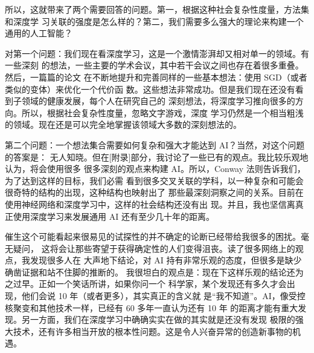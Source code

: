所以，这就带来了两个需要回答的问题。第一，根据这种社会复杂性度量，方法集和深度学
习关联的强度是怎么样的？第二，我们需要多么强大的理论来构建一个通用的人工智能？

对第一个问题：我们现在看深度学习，这是一个激情澎湃却又相对单一的领域。有一些深刻
的想法，一些主要的学术会议，其中若干会议之间也存在着很多重叠。然后，一篇篇的论文
在不断地提升和完善同样的一些基本想法：使用 SGD（或者类似的变体）来优化一个代价函
数。这些想法非常成功。但是我们现在还没有看到子领域的健康发展，每个人在研究自己的
深刻想法，将深度学习推向很多的方向。所以，根据社会复杂性度量，忽略文字游戏，深度
学习仍然是一个相当粗浅的领域。现在还是可以完全地掌握该领域大多数的深刻想法的。

第二个问题：一个想法集合需要如何复杂和强大才能达到 AI？当然，对这个问题的答案是：
无人知晓。但在[附录]部分，我讨论了一些已有的观点。我比较乐观地认为，将会使用很多
很多深刻的观点来构建 AI。所以，Conway 法则告诉我们，为了达到这样的目标，我们必需
看到很多交叉关联的学科，以一种复杂和可能会很奇特的结构的出现，这种结构也映射出了
那些最深刻洞察之间的关系。目前在使用神经网络和深度学习中，这样的社会结构还没有出
现。并且，我也坚信离真正使用深度学习来发展通用 AI 还有至少几十年的距离。

催生这个可能看起来很易见的试探性的并不确定的论断已经带给我很多的困扰。毫无疑问，
这将会让那些寄望于获得确定性的人们变得沮丧。读了很多网络上的观点，我发现很多人在
大声地下结论，对 AI 持有非常乐观的态度，但很多是缺少确凿证据和站不住脚的推断的。
我很坦白的观点是：现在下这样乐观的结论还为之过早。正如一个笑话所讲，如果你问一个
科学家，某个发现还有多久才会出现，他们会说 10 年（或者更多），其实真正的含义就
是“我不知道”。AI，像受控核聚变和其他技术一样，已经有 60 多年一直认为还有 10 年
的距离才能有重大发现。另一方面，我们在深度学习中确确实实在做的其实就是还没有发现
极限的强大技术，还有许多相当开放的根本性问题。这是令人兴奋异常的创造新事物的机遇。
